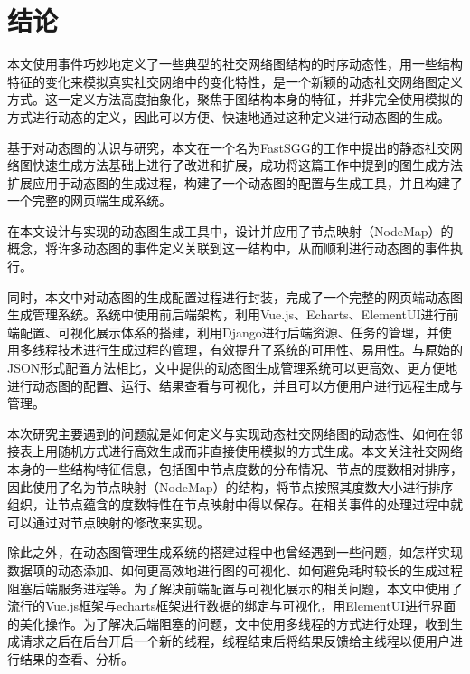 
\chapter{结论}
\label{cha:chapter99}

本文使用事件巧妙地定义了一些典型的社交网络图结构的时序动态性，用一些结构特征的变化来模拟真实社交网络中的变化特性，是一个新颖的动态社交网络图定义方式。这一定义方法高度抽象化，聚焦于图结构本身的特征，并非完全使用模拟的方式进行动态的定义，因此可以方便、快速地通过这种定义进行动态图的生成。

基于对动态图的认识与研究，本文在一个名为FastSGG的工作中提出的静态社交网络图快速生成方法基础上进行了改进和扩展，成功将这篇工作中提到的图生成方法扩展应用于动态图的生成过程，构建了一个动态图的配置与生成工具，并且构建了一个完整的网页端生成系统。

在本文设计与实现的动态图生成工具中，设计并应用了节点映射（NodeMap）的概念，将许多动态图的事件定义关联到这一结构中，从而顺利进行动态图的事件执行。


同时，本文中对动态图的生成配置过程进行封装，完成了一个完整的网页端动态图生成管理系统。系统中使用前后端架构，利用Vue.js、Echarts、ElementUI进行前端配置、可视化展示体系的搭建，利用Django进行后端资源、任务的管理，并使用多线程技术进行生成过程的管理，有效提升了系统的可用性、易用性。与原始的JSON形式配置方法相比，文中提供的动态图生成管理系统可以更高效、更方便地进行动态图的配置、运行、结果查看与可视化，并且可以方便用户进行远程生成与管理。


本次研究主要遇到的问题就是如何定义与实现动态社交网络图的动态性、如何在邻接表上用随机方式进行高效生成而非直接使用模拟的方式生成。本文关注社交网络本身的一些结构特征信息，包括图中节点度数的分布情况、节点的度数相对排序，因此使用了名为节点映射（NodeMap）的结构，将节点按照其度数大小进行排序组织，让节点蕴含的度数特性在节点映射中得以保存。在相关事件的处理过程中就可以通过对节点映射的修改来实现。

除此之外，在动态图管理生成系统的搭建过程中也曾经遇到一些问题，如怎样实现数据项的动态添加、如何更高效地进行图的可视化、如何避免耗时较长的生成过程阻塞后端服务进程等。为了解决前端配置与可视化展示的相关问题，本文中使用了流行的Vue.js框架与echarts框架进行数据的绑定与可视化，用ElementUI进行界面的美化操作。为了解决后端阻塞的问题，文中使用多线程的方式进行处理，收到生成请求之后在后台开启一个新的线程，线程结束后将结果反馈给主线程以便用户进行结果的查看、分析。

